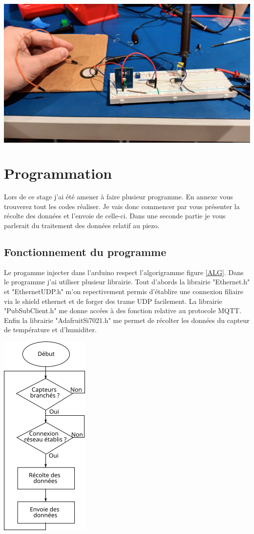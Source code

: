 \documentclass[12pt,french,a4paper]{article}
\begin{document}
\begin{center}	
\includegraphics[scale=0.1]{../img/froty.jpg}
\label{M}
\end{center}

\section{Programmation}
Lors de ce stage j'ai été amener à faire plusieur programme. En annexe vous trouverez tout les codes réaliser. Je vais donc commencer par vous présenter la récolte des données et l'envoie de celle-ci. Dans une seconde partie je vous parlerait du traitement des données relatif au piezo. 

\subsection{Fonctionnement du programme}
Le progamme injecter dans l'arduino respect l'algorigramme figure \ref{ALG}. Dans le programme j'ai utiliser plusieur librairie. Tout d'abords la librairie "Ethernet.h" et "EthernetUDP.h"  m'on repectivement  permis d'établire une connexion filiaire via le shield ethernet et de forger des trame UDP facilement. La librairie "PubSubClient.h" me donne accées à des fonction relative au protocole MQTT. Enfin la librairie "AdafruitSi7021.h" me permet de récolter les données du capteur de température et d'humiditer.  
\begin{center}	
\includegraphics[scale=1]{../img/algorigrame.png}
\label{ALG}
\end{center}
\end{document}
